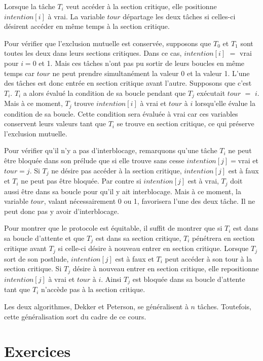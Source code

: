 \par\noindent
Lorsque la tâche $T_i$ veut accéder à la section critique, elle positionne $intention[i]$ à vrai.  La variable $tour$ départage les deux tâches si celles-ci désirent accéder en même temps à la section critique.
\par
Pour vérifier que l'exclusion mutuelle est conservée, supposons que $T_0$ et $T_1$ sont toutes les deux dans leurs sections critiques.
Dans ce cas, $intention[i]$ $=$ vrai pour $i = 0$ et 1.  Mais ces tâches n'ont pas pu sortir de leurs boucles en même temps car $tour$ ne peut prendre simultanément la valeur 0 et la valeur 1.  L'une des tâches est donc entrée en section critique avant l'autre. Supposons que c'est $T_i$. $T_i$ a alors évalué la condition de sa boucle pendant que $T_j$ exécutait $tour$ $=$ $i$.  Mais à ce moment, $T_j$ trouve $intention[i]$ à vrai et $tour$ à $i$ lorsqu'elle évalue la condition de sa boucle.
Cette condition sera évaluée à vrai car ces variables conservent leurs valeurs tant que $T_i$ se trouve en section critique, ce qui préserve l'exclusion mutuelle.
\par
Pour vérifier qu'il n'y a pas d'interblocage, remarquons qu'une tâche $T_i$ ne peut être bloquée dans son prélude que si elle trouve sans cesse $intention[j]=$vrai et $tour=j$.  Si $T_j$ ne désire pas accéder à la section critique, $intention[j]$ est à faux et $T_i$ ne peut pas être bloquée.  Par contre si $intention[j]$ est à vrai, $T_j$ doit aussi être dans sa boucle pour qu'il y ait interblocage.  Mais à ce moment, la variable $tour$, valant nécessairement 0 ou 1, favorisera l'une des deux tâche.  Il ne peut donc pas y avoir d'interblocage.
\par
Pour montrer que le protocole est équitable, il suffit de montrer que si $T_i$ est dans sa boucle d'attente et que $T_j$ est dans sa section critique, $T_i$ pénétrera en section critique avant $T_j$ si celle-ci désire à nouveau entrer en section critique.  Lorsque $T_j$ sort de son postlude, $intention[j]$ est à faux et $T_i$ peut accéder à son tour à la section critique.  Si $T_j$ désire à nouveau entrer en section critique, elle repositionne $intention[j]$ à vrai et $tour$ à $i$.  Ainsi $T_j$ est bloquée dans sa boucle d'attente tant que $T_i$ n'accède pas à la section critique.
\par
Les deux algorithmes, Dekker et Peterson, se généralisent à $n$ tâches. Toutefois, cette généralisation sort du cadre de ce cours.

\section{Exercices}

